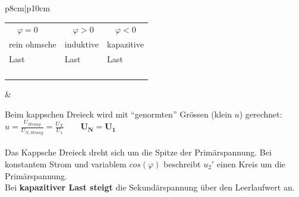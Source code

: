 \begin{tabular}{p{8cm}|p{10cm}}
\begin{minipage}{8cm}
\begin{tabular}[c]{p{2.66cm}p{2.66cm}p{2.66cm}}
                     	$\quad \varphi = 0$ & $\quad\varphi > 0$ & $\quad\varphi
                     	< 0$\\ rein ohmsche & induktive & kapazitive\\
                     	Last & Last & Last\\
                     	&&\\
                     	&&\\
                     	&&\\
                     	&&\\
                     \end{tabular}               
                \end{minipage}& \hspace{0.2cm}
				\begin{minipage}{10cm}
		      		Beim kappschen Dreieck wird mit ``genormten'' Gr\"ossen (klein $u$) gerechnet: 
		      		$u = \frac{U_{Strang}}{U_{N, Strang}} = \frac{U_X}{U_1} \qquad
		      		\boldsymbol{U_N = U_1} $\\ \\ Das Kappsche Dreieck dreht sich um die
		      		Spitze der Prim\"arspannung. Bei konstantem Strom und variablem $cos(\varphi)$ beschreibt ${u}_2'$
		      		einen
		      		Kreis um die Prim\"arspannung.\\ Bei \textbf{kapazitiver Last steigt}
		      		die Sekund\"arspannung über den Leerlaufwert an. \\                  
                \end{minipage}     
            \end{tabular}

		

